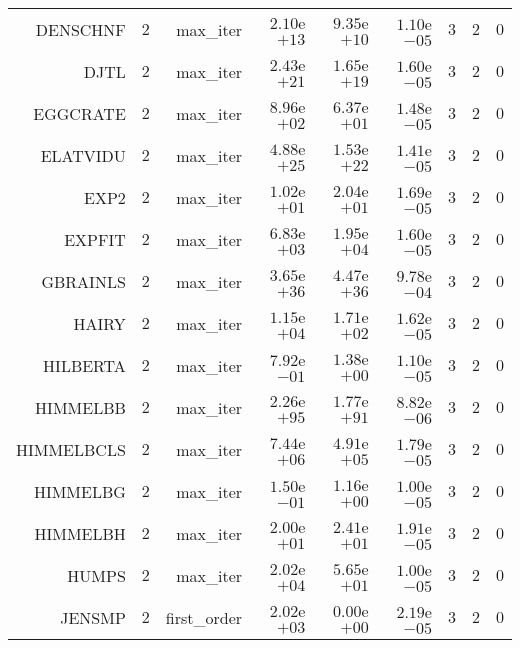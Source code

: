 \begin{longtable}{rrrrrrrrr}
DENSCHNF & \(     2\) & max\_iter & \( 2.10\)e\(+13\) & \( 9.35\)e\(+10\) & \( 1.10\)e\(-05\) & \(     3\) & \(     2\) & \(     0\) \\
DJTL & \(     2\) & max\_iter & \( 2.43\)e\(+21\) & \( 1.65\)e\(+19\) & \( 1.60\)e\(-05\) & \(     3\) & \(     2\) & \(     0\) \\
EGGCRATE & \(     2\) & max\_iter & \( 8.96\)e\(+02\) & \( 6.37\)e\(+01\) & \( 1.48\)e\(-05\) & \(     3\) & \(     2\) & \(     0\) \\
ELATVIDU & \(     2\) & max\_iter & \( 4.88\)e\(+25\) & \( 1.53\)e\(+22\) & \( 1.41\)e\(-05\) & \(     3\) & \(     2\) & \(     0\) \\
EXP2 & \(     2\) & max\_iter & \( 1.02\)e\(+01\) & \( 2.04\)e\(+01\) & \( 1.69\)e\(-05\) & \(     3\) & \(     2\) & \(     0\) \\
EXPFIT & \(     2\) & max\_iter & \( 6.83\)e\(+03\) & \( 1.95\)e\(+04\) & \( 1.60\)e\(-05\) & \(     3\) & \(     2\) & \(     0\) \\
GBRAINLS & \(     2\) & max\_iter & \( 3.65\)e\(+36\) & \( 4.47\)e\(+36\) & \( 9.78\)e\(-04\) & \(     3\) & \(     2\) & \(     0\) \\
HAIRY & \(     2\) & max\_iter & \( 1.15\)e\(+04\) & \( 1.71\)e\(+02\) & \( 1.62\)e\(-05\) & \(     3\) & \(     2\) & \(     0\) \\
HILBERTA & \(     2\) & max\_iter & \( 7.92\)e\(-01\) & \( 1.38\)e\(+00\) & \( 1.10\)e\(-05\) & \(     3\) & \(     2\) & \(     0\) \\
HIMMELBB & \(     2\) & max\_iter & \( 2.26\)e\(+95\) & \( 1.77\)e\(+91\) & \( 8.82\)e\(-06\) & \(     3\) & \(     2\) & \(     0\) \\
HIMMELBCLS & \(     2\) & max\_iter & \( 7.44\)e\(+06\) & \( 4.91\)e\(+05\) & \( 1.79\)e\(-05\) & \(     3\) & \(     2\) & \(     0\) \\
HIMMELBG & \(     2\) & max\_iter & \( 1.50\)e\(-01\) & \( 1.16\)e\(+00\) & \( 1.00\)e\(-05\) & \(     3\) & \(     2\) & \(     0\) \\
HIMMELBH & \(     2\) & max\_iter & \( 2.00\)e\(+01\) & \( 2.41\)e\(+01\) & \( 1.91\)e\(-05\) & \(     3\) & \(     2\) & \(     0\) \\
HUMPS & \(     2\) & max\_iter & \( 2.02\)e\(+04\) & \( 5.65\)e\(+01\) & \( 1.00\)e\(-05\) & \(     3\) & \(     2\) & \(     0\) \\
JENSMP & \(     2\) & first\_order & \( 2.02\)e\(+03\) & \( 0.00\)e\(+00\) & \( 2.19\)e\(-05\) & \(     3\) & \(     2\) & \(     0\) \\

\end{longtable}
